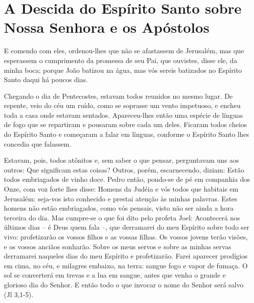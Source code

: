 \documentclass{rosario}
\begin{document}

\TODO


\section{A Descida do Espírito Santo sobre Nossa Senhora e os Apóstolos}






E comendo com eles, ordenou-lhes que não se afastassem de Jerusalém, mas que esperassem o cumprimento da promessa de seu Pai, que ouvistes, disse ele, da minha boca;
porque João batizou na água, mas vós sereis batizados no Espírito Santo daqui há poucos dias.

Chegando o dia de Pentecostes, estavam todos reunidos no mesmo lugar.
De repente, veio do céu um ruído, como se soprasse um vento impetuoso, e encheu toda a casa onde estavam sentados.
Apareceu-lhes então uma espécie de línguas de fogo que se repartiram e pousaram sobre cada um deles.
Ficaram todos cheios do Espírito Santo e começaram a falar em línguas, conforme o Espírito Santo lhes concedia que falassem.

Estavam, pois, todos atônitos e, sem saber o que pensar, perguntavam uns aos outros:
Que significam estas coisas?
Outros, porém, escarnecendo, diziam:
Estão todos embriagados de vinho doce.
Pedro então, pondo-se de pé em companhia dos Onze, com voz forte lhes disse:
Homens da Judéia e vós todos que habitais em Jerusalém:
seja-vos isto conhecido e prestai atenção às minhas palavras.
Estes homens não estão embriagados, como vós pensais, visto não ser ainda a hora terceira do dia.
Mas cumpre-se o que foi dito pelo profeta Joel:
Acontecerá nos últimos dias -- é Deus quem fala --, que derramarei do meu Espírito sobre todo ser vivo:
profetizarão os vossos filhos e as vossas filhas.
Os vossos jovens terão visões, e os vossos anciãos sonharão.
Sobre os meus servos e sobre as minhas servas derramarei naqueles dias do meu Espírito e profetizarão.
Farei aparecer prodígios em cima, no céu, e milagres embaixo, na terra:
sangue fogo e vapor de fumaça.
O sol se converterá em trevas e a lua em sangue, antes que venha o grande e glorioso dia do Senhor.
E então todo o que invocar o nome do Senhor será salvo (Jl 3,1-5).
\end{document}
